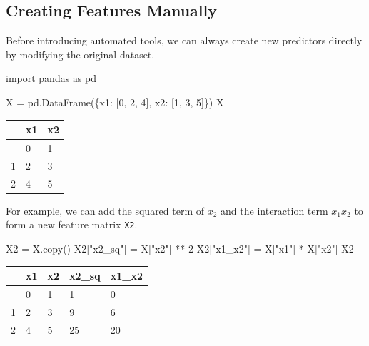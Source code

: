 \documentclass[
  letterpaper,
  DIV=11,
  numbers=noendperiod]{scrreprt}
\newenvironment{Shaded}{\begin{snugshade}}{\end{snugshade}}
\newcommand{\DecValTok}[1]{\textcolor[rgb]{0.68,0.00,0.00}{#1}}
\newcommand{\ImportTok}[1]{\textcolor[rgb]{0.00,0.46,0.62}{#1}}
\newcommand{\NormalTok}[1]{\textcolor[rgb]{0.00,0.23,0.31}{#1}}
\newcommand{\OperatorTok}[1]{\textcolor[rgb]{0.37,0.37,0.37}{#1}}
\newcommand{\StringTok}[1]{\textcolor[rgb]{0.13,0.47,0.30}{#1}}
\newcounter{none} %
\theoremstyle{definition}
\theoremstyle{definition}
\theoremstyle{plain}
\theoremstyle{plain}
\theoremstyle{remark}
\begin{document}
\subsection{Creating Features
Manually}\label{creating-features-manually}

Before introducing automated tools, we can always create new predictors
directly by modifying the original dataset.

\begin{Shaded}
\begin{Highlighting}[]
\ImportTok{import}\NormalTok{ pandas }\ImportTok{as}\NormalTok{ pd}

\NormalTok{X }\OperatorTok{=}\NormalTok{ pd.DataFrame(\{}\StringTok{\textquotesingle{}x1\textquotesingle{}}\NormalTok{: [}\DecValTok{0}\NormalTok{, }\DecValTok{2}\NormalTok{, }\DecValTok{4}\NormalTok{], }\StringTok{\textquotesingle{}x2\textquotesingle{}}\NormalTok{: [}\DecValTok{1}\NormalTok{, }\DecValTok{3}\NormalTok{, }\DecValTok{5}\NormalTok{]\})}
\NormalTok{X}
\end{Highlighting}
\end{Shaded}

{\def\LTcaptype{none} %
\begin{longtable}[]{@{}lll@{}}
\toprule\noalign{}
& x1 & x2 \\
\midrule\noalign{}
\endhead
\bottomrule\noalign{}
\endlastfoot
0 & 0 & 1 \\
1 & 2 & 3 \\
2 & 4 & 5 \\
\end{longtable}
}

For example, we can add the squared term of \(x_2\) and the interaction
term \(x_1x_2\) to form a new feature matrix \texttt{X2}.

\begin{Shaded}
\begin{Highlighting}[]
\NormalTok{X2 }\OperatorTok{=}\NormalTok{ X.copy()}
\NormalTok{X2[}\StringTok{"x2\_sq"}\NormalTok{] }\OperatorTok{=}\NormalTok{ X[}\StringTok{"x2"}\NormalTok{] }\OperatorTok{**} \DecValTok{2}
\NormalTok{X2[}\StringTok{"x1\_x2"}\NormalTok{] }\OperatorTok{=}\NormalTok{ X[}\StringTok{"x1"}\NormalTok{] }\OperatorTok{*}\NormalTok{ X[}\StringTok{"x2"}\NormalTok{]}
\NormalTok{X2}
\end{Highlighting}
\end{Shaded}

{\def\LTcaptype{none} %
\begin{longtable}[]{@{}lllll@{}}
\toprule\noalign{}
& x1 & x2 & x2\_sq & x1\_x2 \\
\midrule\noalign{}
\endhead
\bottomrule\noalign{}
\endlastfoot
0 & 0 & 1 & 1 & 0 \\
1 & 2 & 3 & 9 & 6 \\
2 & 4 & 5 & 25 & 20 \\
\end{longtable}
}
\end{document}

